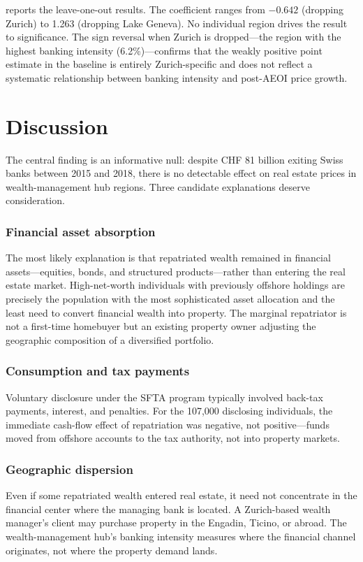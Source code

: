 \documentclass[12pt]{article}
\begin{document}
 reports the leave-one-out results. The coefficient ranges from $-0.642$ (dropping Zurich) to 1.263 (dropping Lake Geneva). No individual region drives the result to significance. The sign reversal when Zurich is dropped---the region with the highest banking intensity (6.2\%)---confirms that the weakly positive point estimate in the baseline is entirely Zurich-specific and does not reflect a systematic relationship between banking intensity and post-AEOI price growth.




\section{Discussion}
\label{sec:discussion}

The central finding is an informative null: despite CHF 81 billion exiting Swiss banks between 2015 and 2018, there is no detectable effect on real estate prices in wealth-management hub regions. Three candidate explanations deserve consideration.

\subsubsection*{Financial asset absorption} The most likely explanation is that repatriated wealth remained in financial assets---equities, bonds, and structured products---rather than entering the real estate market. High-net-worth individuals with previously offshore holdings are precisely the population with the most sophisticated asset allocation and the least need to convert financial wealth into property. The marginal repatriator is not a first-time homebuyer but an existing property owner adjusting the geographic composition of a diversified portfolio.

\subsubsection*{Consumption and tax payments} Voluntary disclosure under the SFTA program typically involved back-tax payments, interest, and penalties. For the 107,000 disclosing individuals, the immediate cash-flow effect of repatriation was negative, not positive---funds moved from offshore accounts to the tax authority, not into property markets.

\subsubsection*{Geographic dispersion} Even if some repatriated wealth entered real estate, it need not concentrate in the financial center where the managing bank is located. A Zurich-based wealth manager's client may purchase property in the Engadin, Ticino, or abroad. The wealth-management hub's banking intensity measures where the financial channel originates, not where the property demand lands.
\end{document}
